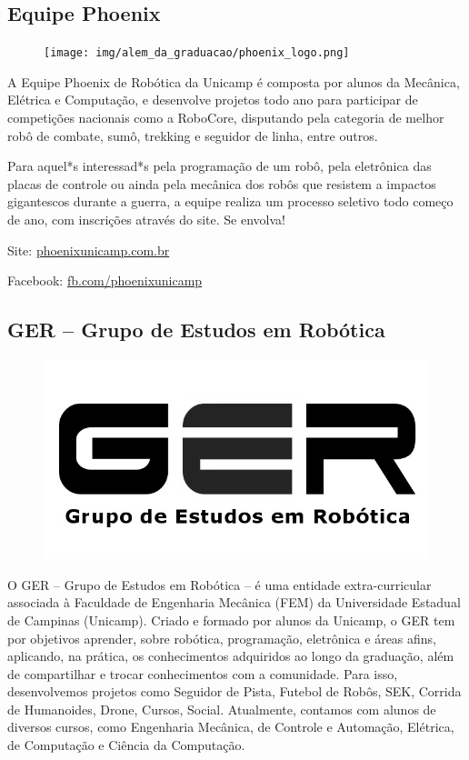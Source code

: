 \subsection{Equipe Phoenix}

\begin{figure}[h!]
    \centering
    \texttt{[image: img/alem\_da\_graduacao/phoenix\_logo.png]}
\end{figure}

A Equipe Phoenix de Robótica da Unicamp é composta por alunos da Mecânica,
Elétrica e Computação, e desenvolve projetos todo ano para participar de
competições nacionais como a RoboCore, disputando pela categoria de melhor robô
de combate, sumô, trekking e seguidor de linha, entre outros.

Para aquel*s interessad*s pela programação de um robô, pela eletrônica das
placas de controle ou ainda pela mecânica dos robôs que resistem a impactos
gigantescos durante a guerra, a equipe realiza um processo seletivo todo começo
de ano, com inscrições através do site. Se envolva!

\begin{compactitemize}
\item Site: \url{phoenixunicamp.com.br}
\item Facebook: \url{fb.com/phoenixunicamp}
\end{compactitemize}

\subsection{GER -- Grupo de Estudos em Robótica}

\begin{figure}[h!]
    \centering
    \includegraphics[width=.35\textwidth]{img/alem_da_graduacao/ger_logo.jpg}
\end{figure}

O GER – Grupo de Estudos em Robótica – é uma entidade extra-curricular
associada à Faculdade de Engenharia Mecânica (FEM) da Universidade Estadual
de Campinas (Unicamp). Criado e formado por alunos da Unicamp, o GER tem por
objetivos aprender, sobre robótica, programação, eletrônica e áreas afins,
aplicando, na prática, os conhecimentos adquiridos ao longo da graduação,
além de compartilhar e trocar conhecimentos com a comunidade. Para isso,
desenvolvemos projetos como Seguidor de Pista, Futebol de Robôs, SEK, Corrida
de Humanoides, Drone, Cursos, Social. Atualmente, contamos com alunos de
diversos cursos, como Engenharia Mecânica, de Controle e Automação, Elétrica,
de Computação e Ciência da Computação.

